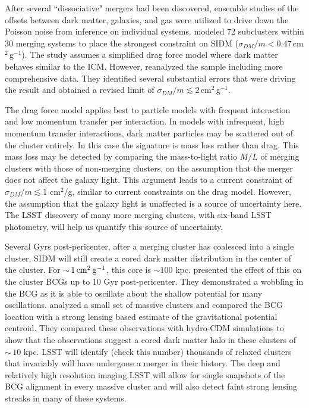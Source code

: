 After several ``dissociative" mergers had been discovered, ensemble studies of the offsets between dark matter, galaxies, and gas were utilized to drive down the Poisson noise from inference on individual systems. \citet{1503.07675} modeled 72 subclusters within 30 merging systems to place the strongest constraint on SIDM ($\sigma_{DM}/m<0.47$\,cm$^{2}$\,g$^{-1}$).
The study assumes a simplified drag force model where dark matter behaves similar to the ICM. However, \citet{1701.05877} reanalyzed the sample including more comprehensive data. They identified several substantial errors that were driving the result and obtained a revised limit of $\sigma_{DM}/m\lesssim 2$\,cm$^{2}$\,g$^{-1}$.

The drag force model applies best to particle models with frequent interaction and low momentum transfer per interaction. In models with infrequent, high  momentum transfer interactions, dark matter particles may be scattered out of the cluster entirely. In this case the signature is mass loss rather than drag. This mass loss may be detected by comparing the mass-to-light ratio $M/L$ of merging clusters with those of non-merging clusters, on the assumption that the merger does not affect the galaxy light. This argument leads to a current constraint of $\sigma_{DM}/m \lesssim 1$ cm$^2$/g, similar to current constraints on the drag model. However, the assumption that the galaxy light is unaffected is a source of uncertainty here. The LSST discovery of many more merging clusters, with six-band LSST photometry, will help us quantify this source of uncertainty. 

Several Gyrs post-pericenter, after a merging cluster has coalesced into a single cluster, SIDM will still create a cored dark matter distribution in the center of the cluster. For $ {\sim}\, 1 \mathrm{\,cm}^{2} \mathrm{\,g}^{-1}$, this core is $\sim 100$ kpc. \citet{1608.08630} presented the effect of this on the cluster BCGs up to 10 Gyr post-pericenter. They demonstrated a wobbling in the BCG as it is able to oscillate about the shallow potential for many oscillations. \citet{1703.07365} analyzed a small set of massive clusters and compared the BCG location with a strong lensing based estimate of the gravitational potential centroid. They compared these observations with hydro-CDM simulations to show that the observations suggest a cored dark matter halo in these clusters of $\sim\,10$ kpc. LSST will identify (check this number) thousands of relaxed clusters that invariably will have undergone a merger in their history. The deep and relatively high resolution imaging LSST will allow for single snapshots of the BCG alignment in every massive cluster and will also detect faint strong lensing streaks in many of these systems.




